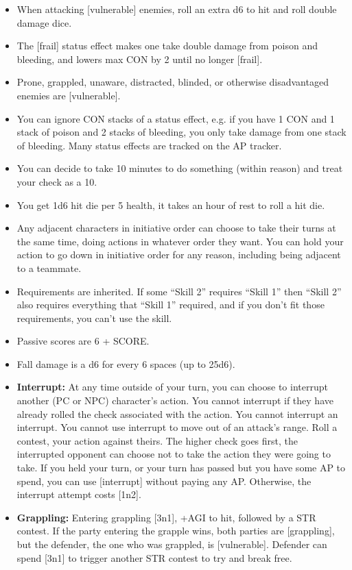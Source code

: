 \documentclass{article}
\begin{document}
\begin{multicols}{2}
  \begin{itemize}

    \item When attacking [vulnerable] enemies, roll an extra d6 to hit and roll double damage dice.
    \item The [frail] status effect makes one take double damage from poison and bleeding, and lowers max CON by 2 until no longer [frail].
    \item Prone, grappled, unaware, distracted, blinded, or otherwise disadvantaged enemies are [vulnerable].
    \item You can ignore CON stacks of a status effect, e.g. if you have 1 CON and 1 stack of poison and 2 stacks of bleeding, you only take damage from one stack of bleeding. Many status effects are tracked on the AP tracker.
    \item You can decide to take 10 minutes to do something (within reason) and treat your check as a 10.
    \item You get 1d6 hit die per 5 health, it takes an hour of rest to roll a hit die.
    \item Any adjacent characters in initiative order can choose to take their turns at the same time, doing actions in whatever order they want. You can hold your action to go down in initiative order for any reason, including being adjacent to a teammate.
    \item Requirements are inherited. If some ``Skill 2'' requires ``Skill 1'' then ``Skill 2'' also requires everything that ``Skill 1'' required, and if you don’t fit those requirements, you can’t use the skill.
    \item Passive scores are 6 + SCORE.
    \item Fall damage is a d6 for every 6 spaces (up to 25d6).

  \end{itemize}
\end{multicols}
\begin{itemize}
  \item \textbf{Interrupt:}
        At any time outside of your turn, you can choose to interrupt another (PC or NPC) character's action. You cannot interrupt if they have already rolled the check associated with the action. You cannot interrupt an interrupt. You cannot use interrupt to move out of an attack's range. Roll a contest, your action against theirs. The higher check goes first, the interrupted opponent can choose not to take the action they were going to take. If you held your turn, or your turn has passed but you have some AP to spend, you can use [interrupt] without paying any AP. Otherwise, the interrupt attempt costs [1n2].
  \item \textbf{Grappling:} Entering grappling [3n1], +AGI to hit, followed by a STR contest. If the party entering the grapple wins, both parties are [grappling], but the defender, the one who was grappled, is [vulnerable]. Defender can spend [3n1] to trigger another STR contest to try and break free.
\end{itemize}
\end{document}

